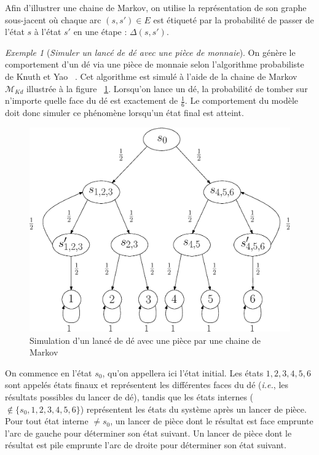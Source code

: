 \documentclass[12pt,a4paper]{report}
\theoremstyle{definition}
\theoremstyle{remark}
\newtheorem{example}{Exemple}[chapter]
\newcommand{\ie}{\textit{i.e.}, }
\let\labelitemi\labelitemii
\begin{document}
Afin d'illustrer une chaine de Markov, on utilise la représentation de son graphe sous-jacent où 
chaque arc $(s, s') \in E$ est étiqueté par la probabilité de passer de l'état $s$ à l'état $s'$ en une étape : $\Delta(s, s')$.

\begin{example} [\textit{Simuler un lancé de dé avec une pièce de monnaie}] \label{knuthdie}
	On génère le comportement d'un dé via une pièce de monnaie selon l'algorithme probabiliste de Knuth et Yao ~\cite{KY76}. Cet algorithme est simulé à l'aide de la chaine de Markov $\mathcal{M}_{Kd}$ illustrée à la figure ~\ref{diebyacoin}. Lorsqu'on lance un dé, la probabilité de tomber sur n'importe quelle face du dé est exactement de $\frac{1}{6}$. Le comportement du modèle doit donc simuler ce phénomène lorsqu'un état final est atteint.
	\begin{figure}[H]
		\centering
		\includegraphics[scale=0.5]{figures/dieByaCoin.eps}
		\caption{Simulation d'un lancé de dé avec une pièce par une chaine de Markov}
		\label{diebyacoin}
	\end{figure}
	On commence en l'état $s_0$, qu'on appellera ici l'état initial. Les états $1, 2, 3, 4, 5, 6$ sont appelés états finaux et représentent les différentes faces du dé (\ie les résultats possibles du lancer de dé), tandis que les états internes ($\notin \{s_0, 1, 2, 3, 4, 5, 6\}$) représentent les états du système après un lancer de pièce. Pour tout état interne $\neq s_0$, un lancer de pièce dont le résultat est face emprunte l'arc de gauche pour déterminer son état suivant. Un lancer de pièce dont le résultat est pile emprunte l'arc de droite pour déterminer son état suivant.\\
	

\end{example}
\end{document}
